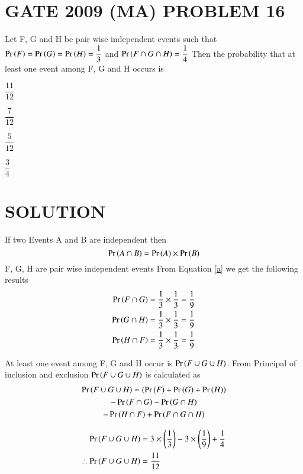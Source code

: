\documentclass[journal,12pt,twocolumn]{IEEEtran}
\begin{document}
\section{GATE 2009 (MA) PROBLEM 16} 
Let F, G and H be pair wise independent events such that $\Pr\left(F\right)=\Pr\left(G\right)=\Pr\left(H\right)=\dfrac{1}{3}$ 
and $\Pr\left(F \cap G \cap H\right)=\dfrac{1}{4}$ Then the probability that at least one event among F, G and H occurs is 
\begin{enumerate}[(A)]
\begin{multicols}{4}
\setlength\itemsep{2em}
\item $\dfrac{11}{12}$
\item $\dfrac{7}{12}$
\item $\dfrac{5}{12}$
\item $\dfrac{3}{4}$
\end{multicols}
\end{enumerate}

\section{SOLUTION}
If two Events A and B are independent then 
\begin{equation}
\Pr\left(A \cap B\right) = \Pr\left(A\right) \times \Pr\left(B\right) \label{a}
\end{equation}
F, G, H are pair wise independent events From Equation \eqref{a} we get the following results
\begin{align*}
\Pr\left(F \cap G\right) &= \dfrac{1}{3} \times \dfrac{1}{3} = \dfrac{1}{9} \\
\Pr\left(G \cap H\right) &= \dfrac{1}{3} \times \dfrac{1}{3} = \dfrac{1}{9} \\
\Pr\left(H \cap F\right) &= \dfrac{1}{3} \times \dfrac{1}{3} = \dfrac{1}{9}
\end{align*}

At least one event among F, G and H occur is $\Pr\left(F\cup G\cup H\right)$.
From Principal of inclusion and exclusion $\Pr\left(F \cup G \cup H\right)$ is calculated as
\begin{multline*}
\Pr\left(F \cup G \cup H\right) = \left(\Pr\left(F\right) + \Pr\left(G\right) + \Pr\left(H\right)\right) 
\\ - \Pr\left(F \cap G\right) - \Pr\left(G \cap H\right)
\\ - \Pr\left(H \cap F\right) + \Pr\left(F \cap G \cap H\right)
\end{multline*}

\newpage

\begin{align*}
\Pr\left(F \cup G \cup H\right) &= 3 \times \left(\dfrac{1}{3}\right) - 3 \times \left(\dfrac{1}{9}\right) + \dfrac{1}{4} \\
\therefore \Pr\left(F \cup G \cup H\right) &= \dfrac{11}{12}
\end{align*}
\end{document}
